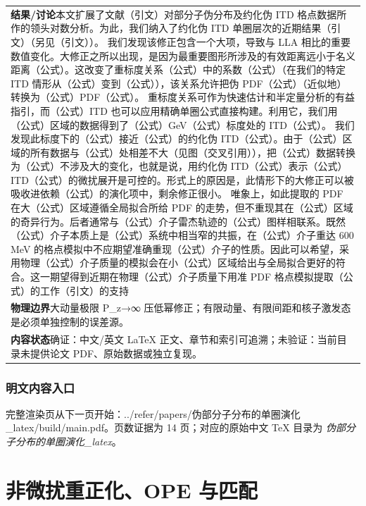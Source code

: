 \documentclass[UTF8,11pt,oneside]{ctexbook}
\begin{document}
\begin{table}[htbp]
\begin{tabular}{@{}p{}@{}}
    \textbf{结果/讨论}\quad 本文扩展了文献（引文）对部分子伪分布及约化伪 ITD 格点数据所作的领头对数分析。为此，我们纳入了约化伪 ITD 单圈层次的近期结果（引文）（另见（引文））。 我们发现该修正包含一个大项，导致与 LLA 相比的重要数值变化。大修正之所以出现，是因为最重要图形所涉及的有效距离远小于名义距离（公式）。这改变了重标度关系（公式）中的系数（公式）（在我们的特定 ITD 情形从（公式）变到（公式）），该关系允许把伪 PDF（公式）（近似地）转换为（公式）PDF（公式）。 重标度关系可作为快速估计和半定量分析的有益指引，而（公式）ITD 也可以应用精确单圈公式直接构建。利用它，我们用（公式）区域的数据得到了（公式）GeV（公式）标度处的 ITD（公式）。 我们发现此标度下的（公式）接近（公式）的约化伪 ITD（公式）。由于（公式）区域的所有数据与（公式）处相差不大（见图（交叉引用）），把（公式）数据转换为（公式）不涉及大的变化，也就是说，用约化伪 ITD（公式）表示（公式）ITD（公式）的微扰展开是可控的。形式上的原因是，此情形下的大修正可以被吸收进依赖（公式）的演化项中，剩余修正很小。 唯象上，如此提取的 PDF 在大（公式）区域遵循全局拟合所给 PDF 的走势，但不重现其在（公式）区域的奇异行为。后者通常与（公式）介子雷杰轨迹的（公式）图样相联系。既然（公式）介子本质上是（公式）系统中相当窄的共振，在（公式）介子重达 600 MeV 的格点模拟中不应期望准确重现（公式）介子的性质。因此可以希望，采用物理（公式）介子质量的模拟会在小（公式）区域给出与全局拟合更好的符合。这一期望得到近期在物理（公式）介子质量下用准 PDF 格点模拟提取（公式）的工作（引文）的支持 \\
    \textbf{物理边界}\quad 大动量极限 P\_z→∞ 压低幂修正；有限动量、有限间距和核子激发态是必须单独控制的误差源。 \\
    \textbf{内容状态}\quad 确证：中文/英文 LaTeX 正文、章节和索引可追溯；未验证：当前目录未提供论文 PDF、原始数据或独立复现。 \\
    \bottomrule
  \end{tabular}
\end{table}
\section*{明文内容入口}
\noindent 完整渲染页从下一页开始：../\allowbreak{}refer/\allowbreak{}papers/\allowbreak{}伪部分子分布的单圈演化\_\allowbreak{}latex/\allowbreak{}build/\allowbreak{}main.pdf。页数证据为 14 页；对应的原始中文 TeX 目录为 \emph{伪部分子分布的单圈演化\_latex}。
\clearpage

\clearpage

\part{非微扰重正化、OPE 与匹配}
\end{document}
